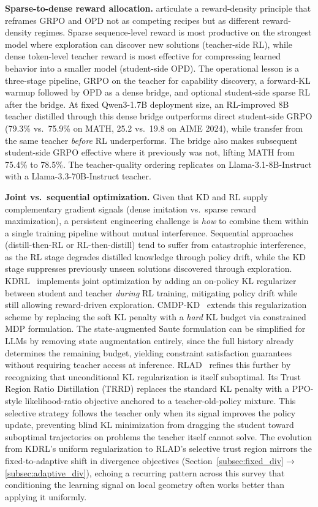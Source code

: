 \documentclass{article} %
\begin{document}
\textbf{Sparse-to-dense reward allocation.} \citet{2605.12483} articulate a reward-density principle that reframes GRPO and OPD not as competing recipes but as different reward-density regimes. Sparse sequence-level reward is most productive on the strongest model where exploration can discover new solutions (teacher-side RL), while dense token-level teacher reward is most effective for compressing learned behavior into a smaller model (student-side OPD). The operational lesson is a three-stage pipeline, GRPO on the teacher for capability discovery, a forward-KL warmup followed by OPD as a dense bridge, and optional student-side sparse RL after the bridge. At fixed Qwen3-1.7B deployment size, an RL-improved 8B teacher distilled through this dense bridge outperforms direct student-side GRPO (79.3\% vs.\ 75.9\% on MATH, 25.2 vs.\ 19.8 on AIME 2024), while transfer from the same teacher \emph{before} RL underperforms. The bridge also makes subsequent student-side GRPO effective where it previously was not, lifting MATH from 75.4\% to 78.5\%. The teacher-quality ordering replicates on Llama-3.1-8B-Instruct with a Llama-3.3-70B-Instruct teacher.

\textbf{Joint vs.\ sequential optimization.} Given that KD and RL supply complementary gradient signals (dense imitation vs.\ sparse reward maximization), a persistent engineering challenge is \emph{how} to combine them within a single training pipeline without mutual interference. Sequential approaches (distill-then-RL or RL-then-distill) tend to suffer from catastrophic interference, as the RL stage degrades distilled knowledge through policy drift, while the KD stage suppresses previously unseen solutions discovered through exploration. KDRL~\citep{2506.02208} implements joint optimization by adding an on-policy KL regularizer between student and teacher \emph{during} RL training, mitigating policy drift while still allowing reward-driven exploration. CMDP-KD~\citep{2509.22921} extends this regularization scheme by replacing the soft KL penalty with a \emph{hard} KL budget via constrained MDP formulation. The state-augmented Saute formulation can be simplified for LLMs by removing state augmentation entirely, since the full history already determines the remaining budget, yielding constraint satisfaction guarantees without requiring teacher access at inference. RLAD~\citep{2602.22495} refines this further by recognizing that unconditional KL regularization is itself suboptimal. Its Trust Region Ratio Distillation (TRRD) replaces the standard KL penalty with a PPO-style likelihood-ratio objective anchored to a teacher-old-policy mixture. This selective strategy follows the teacher only when its signal improves the policy update, preventing blind KL minimization from dragging the student toward suboptimal trajectories on problems the teacher itself cannot solve. The evolution from KDRL's uniform regularization to RLAD's selective trust region mirrors the fixed-to-adaptive shift in divergence objectives (Section~\ref{subsec:fixed_div}$\to$\ref{subsec:adaptive_div}), echoing a recurring pattern across this survey that conditioning the learning signal on local geometry often works better than applying it uniformly.
\end{document}
